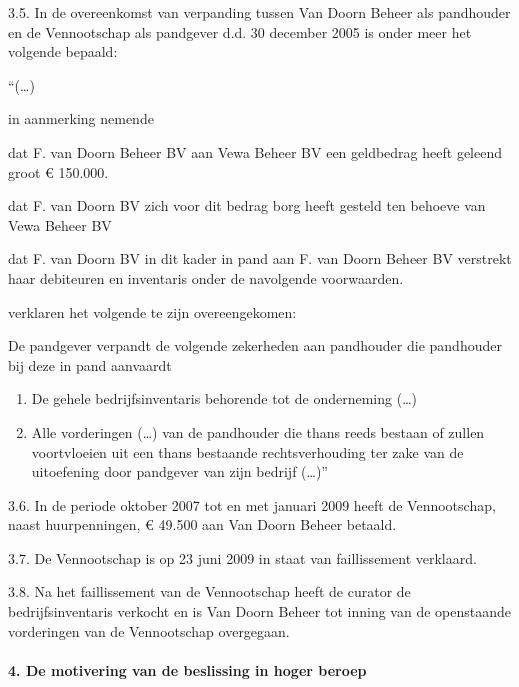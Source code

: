 \documentclass[
  dutch,
  a4paper,
]{article}
\begin{document}
3.5. In de overeenkomst van verpanding tussen Van Doorn Beheer als pandhouder en de Vennootschap als pandgever d.d. 30 december 2005 is onder meer het volgende bepaald:

``(\ldots)

in aanmerking nemende

dat F. van Doorn Beheer BV aan Vewa Beheer BV een geldbedrag heeft geleend groot € 150.000.

dat F. van Doorn BV zich voor dit bedrag borg heeft gesteld ten behoeve van Vewa Beheer BV

dat F. van Doorn BV in dit kader in pand aan F. van Doorn Beheer BV verstrekt haar debiteuren en inventaris onder de navolgende voorwaarden.

verklaren het volgende te zijn overeengekomen:

De pandgever verpandt de volgende zekerheden aan pandhouder die pandhouder bij deze in pand aanvaardt

\begin{enumerate}
\def\labelenumi{\alph{enumi})}
\item
  De gehele bedrijfsinventaris behorende tot de onderneming (\ldots)
\item
  Alle vorderingen (\ldots) van de pandhouder die thans reeds bestaan of zullen voortvloeien uit een thans bestaande rechtsverhouding ter zake van de uitoefening door pandgever van zijn bedrijf (\ldots)''
\end{enumerate}

3.6. In de periode oktober 2007 tot en met januari 2009 heeft de Vennootschap, naast huurpenningen, € 49.500 aan Van Doorn Beheer betaald.

3.7. De Vennootschap is op 23 juni 2009 in staat van faillissement verklaard.

3.8. Na het faillissement van de Vennootschap heeft de curator de bedrijfsinventaris verkocht en is Van Doorn Beheer tot inning van de openstaande vorderingen van de Vennootschap overgegaan.

\paragraph{4. De motivering van de beslissing in hoger beroep}\label{de-motivering-van-de-beslissing-in-hoger-beroep}
\end{document}
